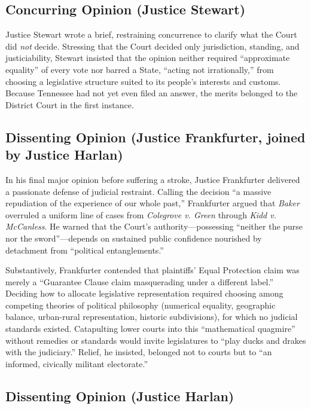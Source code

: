 \documentclass[12pt]{article}
\begin{document}
\subsection{Concurring Opinion (Justice Stewart)}

Justice Stewart wrote a brief, restraining concurrence to clarify what the Court did \textit{not} decide. Stressing that the Court decided only jurisdiction, standing, and justiciability, Stewart insisted that the opinion neither required ``approximate equality'' of every vote nor barred a State, ``acting not irrationally,'' from choosing a legislative structure suited to its people's interests and customs. Because Tennessee had not yet even filed an answer, the merits belonged to the District Court in the first instance.

\subsection{Dissenting Opinion (Justice Frankfurter, joined by Justice Harlan)}

In his final major opinion before suffering a stroke, Justice Frankfurter delivered a passionate defense of judicial restraint. Calling the decision ``a massive repudiation of the experience of our whole past,'' Frankfurter argued that \textit{Baker} overruled a uniform line of cases from \textit{Colegrove v. Green} through \textit{Kidd v. McCanless}. He warned that the Court's authority---possessing ``neither the purse nor the sword''---depends on sustained public confidence nourished by detachment from ``political entanglements.''

Substantively, Frankfurter contended that plaintiffs' Equal Protection claim was merely a ``Guarantee Clause claim masquerading under a different label.'' Deciding how to allocate legislative representation required choosing among competing theories of political philosophy (numerical equality, geographic balance, urban-rural representation, historic subdivisions), for which no judicial standards existed. Catapulting lower courts into this ``mathematical quagmire'' without remedies or standards would invite legislatures to ``play ducks and drakes with the judiciary.'' Relief, he insisted, belonged not to courts but to ``an informed, civically militant electorate.''

\subsection{Dissenting Opinion (Justice Harlan)}
\end{document}
